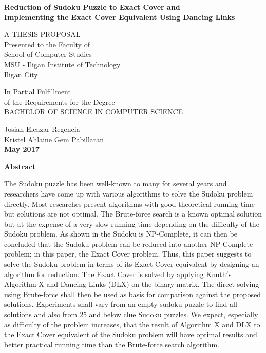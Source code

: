 \documentclass[a4paper,oneside,11pt]{report}
\begin{document}
\thispagestyle{empty}
\singlespacing
\begin{center}

{\bf\Large Reduction of Sudoku Puzzle to Exact Cover and}\\
{\bf\Large Implementing the Exact Cover Equivalent Using Dancing Links}

\vspace{\fill}

{A THESIS PROPOSAL}\\[.25in]

{Presented to the Faculty of\\
School of Computer Studies\\
MSU - Iligan Institute of Technology\\
Iligan City}

\vspace{\fill}

{In Partial Fulfillment\\
of the Requirements for the Degree\\
BACHELOR OF SCIENCE IN COMPUTER SCIENCE}\\

\vspace{\fill}

{Josiah Eleazar Regencia\\
Kristel Ahlaine Gem Pabillaran}\\
{\bf May 2017}

\end{center}

\newpage
\doublespacing
{}
\begin{center}
 \textbf{\Large Abstract}
\end{center}
\vspace{0.8cm}

The Sudoku puzzle has been well-known to many for several years and researchers have come up with various algorithms to solve the Sudoku problem directly. Most researches present algorithms with good theoretical running time but solutions are not optimal. The Brute-force search is a known optimal solution but at the expense of a very slow running time depending on the difficulty of the Sudoku problem. As shown in \cite{Yato} the Sudoku is NP-Complete, it can then be concluded that the Sudoku problem can be reduced into another NP-Complete problem; in this paper, the Exact Cover problem. Thus, this paper suggests to solve the Sudoku problem in terms of its Exact Cover equivalent by designing an algorithm for reduction. The Exact Cover is solved by applying Knuth$'$s Algorithm X and Dancing Links (DLX) on the binary matrix. The direct solving using Brute-force shall then be used as basis for comparison against the proposed solutions. Experiments shall vary from an empty sudoku puzzle to find all solutions and also from 25 and below clue Sudoku puzzles. We expect, especially as difficulty of the problem increases, that the result of Algorithm X and DLX to the Exact Cover equivalent of the Sudoku problem will have optimal results and better practical running time than the Brute-force search algorithm.
\end{document}
